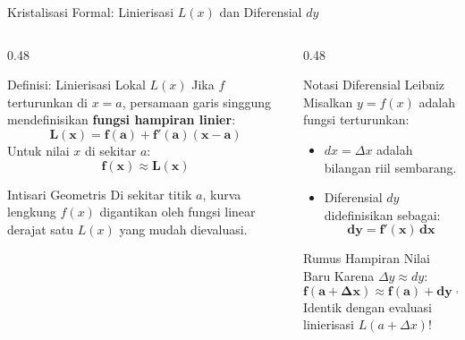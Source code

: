 \documentclass[aspectratio=169,10pt]{beamer}
\begin{document}
\begin{frame}{Kristalisasi Formal: Linierisasi $L(x)$ dan Diferensial $dy$}
    \begin{columns}[T]
        \begin{column}{0.48\textwidth}
            \begin{block}{Definisi: Linierisasi Lokal $L(x)$}
                Jika $f$ terturunkan di $x = a$, persamaan garis singgung mendefinisikan \textbf{fungsi hampiran linier}:
                \[
                    \mathbf{L(x) = f(a) + f'(a)(x - a)}
                \]
                Untuk nilai $x$ di sekitar $a$:
                \[
                    \mathbf{f(x) \approx L(x)}
                \]
            \end{block}

            \begin{exampleblock}{Intisari Geometris}
                Di sekitar titik $a$, kurva lengkung $f(x)$ digantikan oleh fungsi linear derajat satu $L(x)$ yang mudah dievaluasi.
            \end{exampleblock}
        \end{column}

        \begin{column}{0.48\textwidth}
            \begin{block}{Notasi Diferensial Leibniz}
                Misalkan $y = f(x)$ adalah fungsi terturunkan:
                \begin{itemize}
                    \item $dx = \Delta x$ adalah bilangan riil sembarang.
                    \item Diferensial $dy$ didefinisikan sebagai:
                    \[
                        \mathbf{dy = f'(x)\,dx}
                    \]
                \end{itemize}
            \end{block}

            \begin{alertblock}{Rumus Hampiran Nilai Baru}
                Karena $\Delta y \approx dy$:
                \[
                    \mathbf{f(a + \Delta x) \approx f(a) + dy = f(a) + f'(a)\Delta x}
                \]
                Identik dengan evaluasi linierisasi $L(a + \Delta x)$!
            \end{alertblock}
        \end{column}
    \end{columns}
\end{frame}
\end{document}
